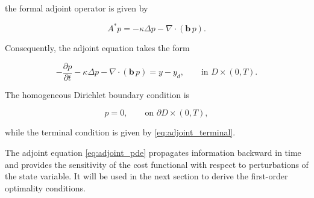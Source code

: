 the formal adjoint operator is given by

\begin{equation}
A^\ast p
=
-\kappa \Delta p
-
\nabla\cdot(\mathbf b\,p).
\label{eq:adjoint_operator}
\end{equation}

Consequently, the adjoint equation takes the form

\begin{equation}
-\frac{\partial p}{\partial t}
-\kappa \Delta p
-\nabla\cdot(\mathbf b\,p)
=
y-y_d,
\qquad
\text{in }
D\times(0,T).
\label{eq:adjoint_pde}
\end{equation}

The homogeneous Dirichlet boundary condition is

\begin{equation}
p=0,
\qquad
\text{on }
\partial D\times(0,T),
\label{eq:adjoint_bc}
\end{equation}

while the terminal condition is given by \eqref{eq:adjoint_terminal}.

The adjoint equation \eqref{eq:adjoint_pde} propagates information backward in time and provides 
the sensitivity of the cost functional with respect to perturbations of the state variable. 
It will be used in the next section to derive the first-order optimality conditions.
